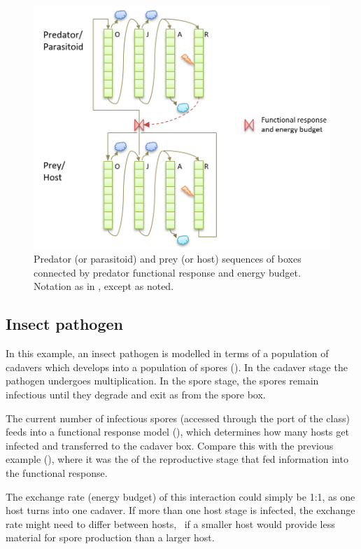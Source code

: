 \begin{figure} [ht]
\centering
\includegraphics[width=.9\textwidth]{graphics/phys-dev-appl-3}
\caption{Predator (or parasitoid) and prey (or host) sequences of  boxes connected by predator functional response and energy budget. Notation as in , except as noted.}
\label{fig:phys-dev-appl-3}
\end{figure}

\subsection {Insect pathogen}

In this example, an insect pathogen is modelled in terms of a population of cadavers which develops into a population of spores (). In the cadaver stage the pathogen undergoes multiplication. In the spore stage, the spores remain infectious until they degrade and exit as  from the spore  box. 

The current number of infectious spores (accessed through the  port of the  class) feeds into a functional response model (), which determines how many hosts get infected and  transferred to the cadaver box. Compare this with the previous example (), where it was the  of the reproductive stage that fed information into the functional response.

The exchange rate (energy budget) of this interaction could simply be 1:1, as one host turns into one cadaver. If more than one host stage is infected, the exchange rate might need to differ between hosts, \eg\ if a smaller host would provide less material for spore production than a larger host.

